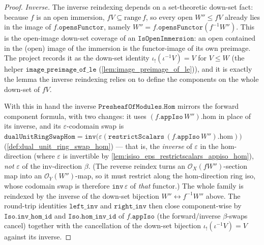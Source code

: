 \begin{proof}
  \emph{Inverse.} The inverse reindexing depends on a set-theoretic down-set fact: because
  \(f\) is an open immersion, \(fV \subseteq \mathrm{range}\,f\), so every open
  \(W'' \le fV\) already lies in the image of \(f.\mathtt{opensFunctor}\), namely
  \(W'' = f.\mathtt{opensFunctor}(f^{-1}W'')\). This is the open-image down-set coverage of an
  \(\mathtt{IsOpenImmersion}\): an open contained in the (open) image of the immersion is the
  functor-image of its own preimage. The project records it as the down-set identity
  \(\iota_!(\iota^{-1}V) = V\) for \(V \le W\) (the helper
  \(\mathtt{image\_preimage\_of\_le}\) (\cref{lem:image_preimage_of_le})),
  and it is exactly the lemma the inverse reindexing relies on to define the components on the
  whole down-set of \(fV\).

  With this in hand the inverse \(\mathtt{PresheafOfModules.Hom}\) mirrors the forward
  component formula, with two changes: it uses \((f.\mathtt{appIso}\,W'').\mathrm{hom}\) in
  place of its inverse, and its \(\varepsilon\)-codomain swap is
  \(\mathtt{dualUnitRingSwapHom} = \mathtt{inv}\bigl(\varepsilon(\mathtt{restrictScalars}\,
  (f.\mathtt{appIso}\,W'').\mathrm{hom})\bigr)\) (\cref{def:dual_unit_ring_swap_hom})
  --- that is, the \emph{inverse} of \(\varepsilon\) in the \(\mathrm{hom}\)-direction (where
  \(\varepsilon\) is invertible by
  \cref{lem:isiso_eps_restrictscalars_appiso_hom}), \emph{not}
  \(\varepsilon\) of the \(\mathrm{inv}\)-direction \(\beta\). (The reverse reindex turns an
  \(\mathcal{O}_X(fW'')\)-section map into an \(\mathcal{O}_Y(W'')\)-map, so it must restrict
  along the \(\mathrm{hom}\)-direction ring iso, whose codomain swap is therefore \(\mathtt{inv}\,
  \varepsilon\) of \emph{that} functor.) The whole family is reindexed by the inverse of the
  down-set bijection \(W'' \leftrightarrow f^{-1}W''\) above. The round-trip identities \(\mathtt{left\_inv}\)
  and \(\mathtt{right\_inv}\) then close component-wise by \(\mathtt{Iso.inv\_hom\_id}\) and
  \(\mathtt{Iso.hom\_inv\_id}\) of \(f.\mathtt{appIso}\) (the forward/inverse \(\beta\)-swaps
  cancel) together with the cancellation of the down-set bijection
  \(\iota_!(\iota^{-1}V) = V\) against its inverse.


\end{proof}
